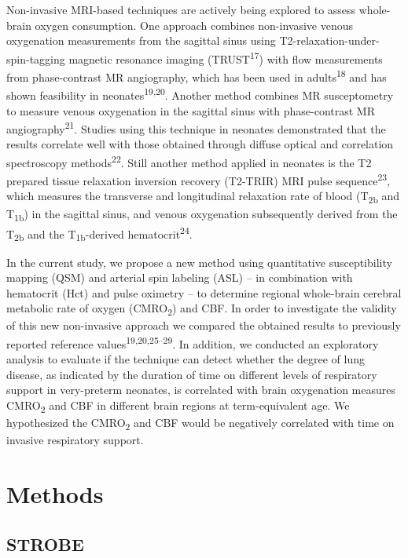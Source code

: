 \documentclass[
  letterpaper,
  DIV=11,
  numbers=noendperiod]{scrartcl}
\begin{document}
Non-invasive MRI-based techniques are actively being explored to assess
whole-brain oxygen consumption. One approach combines non-invasive
venous oxygenation measurements from the sagittal sinus using
T2-relaxation-under-spin-tagging magnetic resonance imaging
(TRUST\textsuperscript{17}) with flow measurements from phase-contrast
MR angiography, which has been used in adults\textsuperscript{18} and
has shown feasibility in neonates\textsuperscript{19,20}. Another method
combines MR susceptometry to measure venous oxygenation in the sagittal
sinus with phase-contrast MR angiography\textsuperscript{21}. Studies
using this technique in neonates demonstrated that the results correlate
well with those obtained through diffuse optical and correlation
spectroscopy methods\textsuperscript{22}. Still another method applied
in neonates is the T2 prepared tissue relaxation inversion recovery
(T2-TRIR) MRI pulse sequence\textsuperscript{23}, which measures the
transverse and longitudinal relaxation rate of blood
(T\textsubscript{2b} and T\textsubscript{1b}) in the sagittal sinus, and
venous oxygenation subsequently derived from the T\textsubscript{2b} and
the T\textsubscript{1b}-derived hematocrit\textsuperscript{24}.

In the current study, we propose a new method using quantitative
susceptibility mapping (QSM) and arterial spin labeling (ASL) -- in
combination with hematocrit (Hct) and pulse oximetry -- to determine
regional whole-brain cerebral metabolic rate of oxygen
(CMRO\textsubscript{2}) and CBF. In order to investigate the validity of
this new non-invasive approach we compared the obtained results to
previously reported reference values\textsuperscript{19,20,25--29}. In
addition, we conducted an exploratory analysis to evaluate if the
technique can detect whether the degree of lung disease, as indicated by
the duration of time on different levels of respiratory support in
very-preterm neonates, is correlated with brain oxygenation measures
CMRO\textsubscript{2} and CBF in different brain regions at
term-equivalent age. We hypothesized the CMRO\textsubscript{2} and CBF
would be negatively correlated with time on invasive respiratory
support.

\section{Methods}\label{methods}

\subsection{STROBE}\label{strobe}
\end{document}
